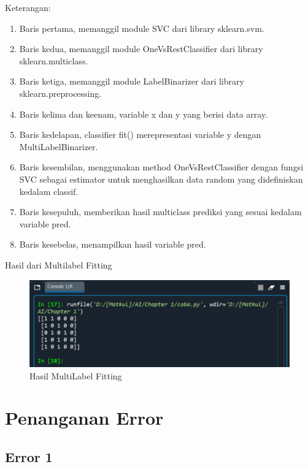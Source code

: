 \par Keterangan:
    \begin{enumerate}
        \item Baris pertama, memanggil module SVC dari library sklearn.svm.
        \item Baris kedua, memanggil module OneVsRestClassifier dari library sklearn.multiclass.
        \item Baris ketiga, memanggil module LabelBinarizer dari library sklearn.preprocessing.
        \item Baris kelima dan keenam, variable x dan y yang berisi data array.
        \item Baris kedelapan, classifier fit() merepresentasi variable y dengan MultiLabelBinarizer.
        \item Baris kesembilan, menggunakan method OneVsRestClassifier dengan fungsi SVC sebagai estimator untuk menghasilkan data random yang didefiniskan kedalam classif.
        \item Baris kesepuluh, memberikan hasil multiclass prediksi yang sesuai kedalam variable pred.
        \item Baris kesebelas, menampilkan hasil variable pred. 
    \end{enumerate}

\par Hasil dari Multilabel Fitting

    \begin{figure}[H]
    \centering
    \includegraphics[width=13cm]{figures/chapter1/31.PNG}
    \caption{Hasil MultiLabel Fitting}
    \end{figure}

\section{Penanganan Error}

\subsection{Error 1}

